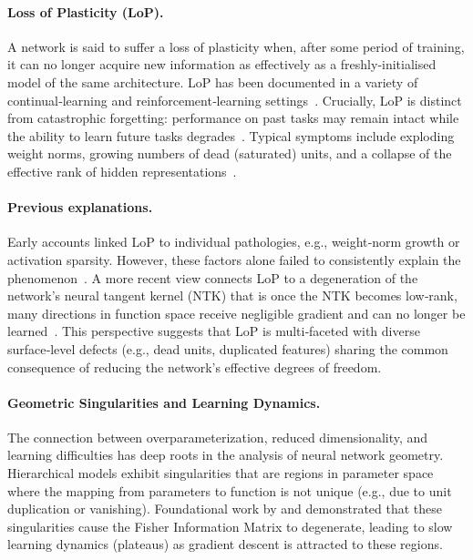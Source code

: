 \documentclass{article}
\numberwithin{figure}{section}
\begin{document}
\paragraph{Loss of Plasticity (LoP).}  
A network is said to suffer a {loss of plasticity} when, after some period of training, it can no longer acquire new information as effectively as a freshly‑initialised model of the same architecture.  LoP has been documented in a variety of continual‑learning and reinforcement‑learning settings~\citep{dohare2024loss,nikishin2022primacy}.  Crucially, LoP is distinct from catastrophic forgetting: performance on {past} tasks may remain intact while the ability to learn {future} tasks degrades~\citep{lyle2023understanding}.  Typical symptoms include exploding weight norms, growing numbers of dead (saturated) units, and a collapse of the effective rank of hidden representations~\citep{dohare2021continual,papyan2020prevalence}.

\vspace{-7pt}
\paragraph{Previous explanations.}  
Early accounts linked LoP to individual pathologies, e.g., weight‑norm growth or activation sparsity. However, these factors alone failed to consistently explain the phenomenon~\citep{lyle2022understanding}.  A more recent view connects LoP to a degeneration of the network’s {neural tangent kernel} (NTK) that is once the NTK becomes low‑rank, many directions in function space receive negligible gradient and can no longer be learned~\citep{lyle2023understanding}.  This perspective suggests that LoP is multi‑faceted with diverse surface‑level defects (e.g., dead units, duplicated features) sharing the common consequence of reducing the network’s effective degrees of freedom.

\vspace{-7pt}
\paragraph{Geometric Singularities and Learning Dynamics.}
The connection between overparameterization, reduced dimensionality, and learning difficulties has deep roots in the analysis of neural network geometry. Hierarchical models exhibit {singularities} that are regions in parameter space where the mapping from parameters to function is not unique (e.g., due to unit duplication or vanishing). Foundational work by \citet{fukumizu2000local} and \citet{amari2006singularities} demonstrated that these singularities cause the Fisher Information Matrix to degenerate, leading to slow learning dynamics (plateaus) as gradient descent is attracted to these regions.
\end{document}
